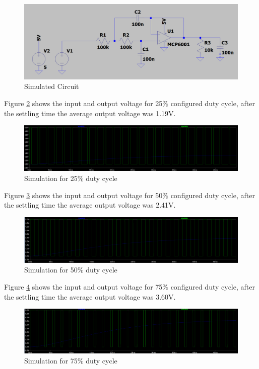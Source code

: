 		\begin{figure}[htbp]
			\centering
			\includegraphics[width=.8\textwidth]{figuras/fig-sim}
			\caption{Simulated Circuit}
			\label{fig:sim}
		\end{figure}

		Figure \ref{fig:sim-dt-25} shows the input and output voltage for 25$\%$ configured duty cycle, after the settling time the average output voltage was 1.19V.

		\begin{figure}[htbp]
			\centering
			\includegraphics[width=.8\textwidth]{figuras/fig-sim-dt-25}
			\caption{Simulation for 25$\%$ duty cycle}
			\label{fig:sim-dt-25}
		\end{figure}

		Figure \ref{fig:sim-dt-50} shows the input and output voltage for 50$\%$ configured duty cycle, after the settling time the average output voltage was 2.41V.

		\begin{figure}[htbp]
			\centering
			\includegraphics[width=.8\textwidth]{figuras/fig-sim-dt-50}
			\caption{Simulation for 50$\%$ duty cycle}
			\label{fig:sim-dt-50}
		\end{figure}

		Figure \ref{fig:sim-dt-75} shows the input and output voltage for 75$\%$ configured duty cycle, after the settling time the average output voltage was 3.60V.

		\begin{figure}[htbp]
			\centering
			\includegraphics[width=.8\textwidth]{figuras/fig-sim-dt-75}
			\caption{Simulation for 75$\%$ duty cycle}
			\label{fig:sim-dt-75}
		\end{figure}

